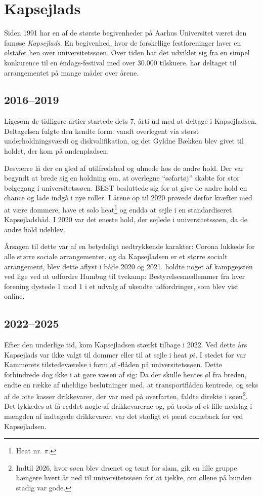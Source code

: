 \section{Kapsejlads}
Siden 1991 har en af de største begivenheder på Aarhus Universitet været den famøse \textit{Kapsejlads}. En begivenhed, hvor de forskellige festforeninger laver en ølstafet hen over universitetssøen. Over tiden har det udviklet sig fra en simpel konkurence til en éndags-festival med over 30.000 tilskuere. \TKET har deltaget til arrangementet på mange måder over årene. 

\subsection{2016--2019}
Ligesom de tidligere årtier startede \TKET dets 7. årti ud med at deltage i Kapsejladsen. Deltagelsen fulgte den kendte form: \TKET vandt overlegent via størst underholdningsværdi og diskvalifikation, og det Gyldne Bækken blev givet til holdet, der kom på andenpladsen.

Desværre lå der en glød af utilfredshed og ulmede hos de andre hold. Der var begyndt at brede sig en holdning om, at \TKETs overlegne ``søfartøj'' skabte for stor bølgegang i universitetssøen. BEST besluttede sig for at give de andre hold en chance og lade \TKET indgå i nye roller. I årene op til 2020 prøvede \TKET derfor kræfter med at være dommere, have et solo heat\footnote{Heat nr. $\pi$.} og endda at sejle i en standardiseret Kapsejladsbåd. I 2020 var \TKET det eneste hold, der sejlede i universitetssøen, da de andre hold udeblev.

Årsagen til dette var af en betydeligt nedtrykkende karakter: Corona lukkede for alle større sociale arrangementer, og da Kapsejladsen er et større socialt arrangement, blev dette aflyst i både 2020 og 2021. \TKET holdte noget af kampgejsten ved lige ved at udfordre Humbug til tvekamp: Bestyrelsesmedlemmer fra hver forening dystede 1 mod 1 i et udvalg af ukendte udfordringer, som blev vist online.

\subsection{2022--2025}
Efter den underlige tid, kom Kapsejladsen stærkt tilbage i 2022. Ved dette års Kapsejlads var \TKET ikke valgt til dommer eller til at sejle i heat $pi$. I stedet for var Kammerets tilstedeværelse i form af \TK-flåden på universitetssøen. Dette forhindrede dog ikke \TKET i at gøre væsen af sig: Da der skulle hentes øl fra breden, endte en række af uheldige beslutninger med, at transportflåden kentrede, og seks af de otte kasser drikkevarer, der var med på overfarten, faldte direkte i søen\footnote{Indtil 2026, hvor søen blev drænet og tømt for slam, gik en lille gruppe hængere hvert år ned til universitetssøen for at tjekke, om øllene på bunden stadig var gode.}. Det lykkedes at få reddet nogle af drikkevarerne og, på trods af et lille nedslag i mængden af indtagede drikkevarer, var det stadigt et pænt comeback for \TKET ved Kapsejladsen.

